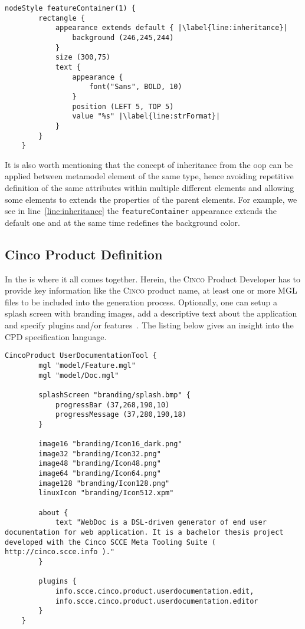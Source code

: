 \begin{lstlisting}[language=MGL, caption={Excerpt from feature.style to be applied to feature.mgl}, label=docStyle, escapechar=|, name=docMSL]
    nodeStyle featureContainer(1) {
        rectangle {
            appearance extends default { |\label{line:inheritance}|
                background (246,245,244)
            }
            size (300,75)
            text {
                appearance {
                    font("Sans", BOLD, 10)
                }
                position (LEFT 5, TOP 5)
                value "%s" |\label{line:strFormat}|
            }
        }
    }
\end{lstlisting}

It is also worth mentioning that the concept of inheritance from the \gls*{oop} can be applied between metamodel element of the same type, hence avoiding repetitive definition of the same attributes within multiple different elements and allowing some elements to extends the properties of the parent elements. For example, we see in line~\ref{line:inheritance} the \lstinline{featureContainer} appearance extends the default one and at the same time redefines the background color.

\subsection{Cinco Product Definition}\label{sec:CPD}

In the  is where it all comes together. Herein, the \textsc{Cinco} Product Developer has to provide key information like the \textsc{Cinco} product name, at least one or more MGL files to be included into the generation process. Optionally, one can setup a splash screen with branding images, add a descriptive text about the application and specify plugins and/or features~\cite{gitlabcinco}.
The listing below gives an insight into the CPD specification language.

\begin{lstlisting}[language=MGL, caption={UserDocumentationTool.cpd}]
    CincoProduct UserDocumentationTool {
        mgl "model/Feature.mgl"
        mgl "model/Doc.mgl"
        
        splashScreen "branding/splash.bmp" {
            progressBar (37,268,190,10)
            progressMessage (37,280,190,18)
        }
    
        image16 "branding/Icon16_dark.png"
        image32 "branding/Icon32.png"
        image48 "branding/Icon48.png"
        image64 "branding/Icon64.png"
        image128 "branding/Icon128.png"
        linuxIcon "branding/Icon512.xpm"
	
        about {
            text "WebDoc is a DSL-driven generator of end user documentation for web application. It is a bachelor thesis project developed with the Cinco SCCE Meta Tooling Suite ( http://cinco.scce.info )."
        }

        plugins {
            info.scce.cinco.product.userdocumentation.edit,
            info.scce.cinco.product.userdocumentation.editor
        }
    }
\end{lstlisting}

